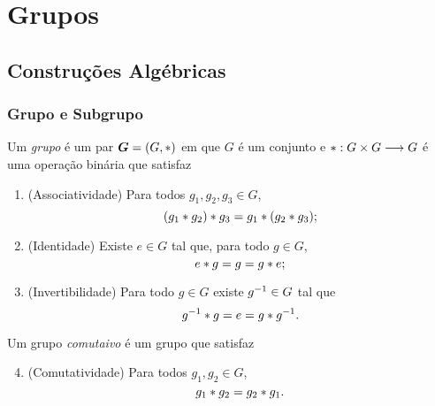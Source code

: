 \chapter{Grupos}

\section{Construções Algébricas}

\subsection{Grupo e Subgrupo}


\begin{defi}
Um \emph{grupo} é um par $\bm G=(G, \ast )$ em que $G$ é um conjunto e $\ast : G \times G \longrightarrow G$ é uma operação binária que satisfaz
	\begin{enumerate}[label=\textbf{G\arabic*.},ref={G\arabic*}]
	\item \label{G1}(Associatividade) Para todos $g_1,g_2,g_3 \in G$,
		\begin{equation*}
		(g_1 \ast g_2) \ast g_3 = g_1 \ast (g_2 \ast g_3);
		\end{equation*}
	\item \label{G2} (Identidade) Existe $e \in G$ tal que, para todo $g \in G$,
		\begin{equation*}
		e \ast  g = g =g  \ast e;
		\end{equation*}
	\item \label{G3} (Invertibilidade) Para todo $g \in G$ existe $g^{-1} \in G$ tal que
		\begin{equation*}
		g^{-1} \ast g = e = g \ast g^{-1}.
		\end{equation*}
	\end{enumerate}
\noindent
Um grupo \emph{comutaivo} é um grupo que satisfaz
	\begin{enumerate}[label=\textbf{G\arabic*.},ref={G\arabic*}]
	\setcounter{enumi}{3}
	\item \label{G4} (Comutatividade) Para todos $g_1,g_2 \in G$,
	\begin{equation*}
	g_1 \ast g_2 = g_2 \ast g_1.
	\end{equation*}
	\end{enumerate}	
\end{defi}

